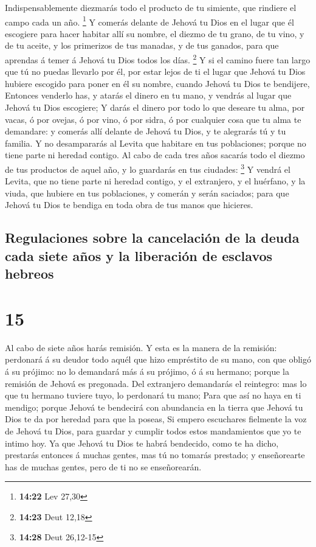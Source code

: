  Indispensablemente diezmarás todo el producto de tu
simiente, que rindiere el campo cada un año. \footnote{\textbf{14:22}
  Lev 27,30}  Y comerás delante de Jehová tu Dios en el
lugar que él escogiere para hacer habitar allí su nombre, el diezmo de
tu grano, de tu vino, y de tu aceite, y los primerizos de tus manadas, y
de tus ganados, para que aprendas á temer á Jehová tu Dios todos los
días. \footnote{\textbf{14:23} Deut 12,18}  Y si el camino
fuere tan largo que tú no puedas llevarlo por él, por estar lejos de ti
el lugar que Jehová tu Dios hubiere escogido para poner en él su nombre,
cuando Jehová tu Dios te bendijere,  Entonces venderlo has,
y atarás el dinero en tu mano, y vendrás al lugar que Jehová tu Dios
escogiere;  Y darás el dinero por todo lo que deseare tu
alma, por vacas, ó por ovejas, ó por vino, ó por sidra, ó por cualquier
cosa que tu alma te demandare: y comerás allí delante de Jehová tu Dios,
y te alegrarás tú y tu familia.  Y no desampararás al
Levita que habitare en tus poblaciones; porque no tiene parte ni heredad
contigo.  Al cabo de cada tres años sacarás todo el diezmo
de tus productos de aquel año, y lo guardarás en tus ciudades:
\footnote{\textbf{14:28} Deut 26,12-15}  Y vendrá el
Levita, que no tiene parte ni heredad contigo, y el extranjero, y el
huérfano, y la viuda, que hubiere en tus poblaciones, y comerán y serán
saciados; para que Jehová tu Dios te bendiga en toda obra de tus manos
que hicieres.

\hypertarget{regulaciones-sobre-la-cancelaciuxf3n-de-la-deuda-cada-siete-auxf1os-y-la-liberaciuxf3n-de-esclavos-hebreos}{%
\subsection{Regulaciones sobre la cancelación de la deuda cada siete
años y la liberación de esclavos
hebreos}\label{regulaciones-sobre-la-cancelaciuxf3n-de-la-deuda-cada-siete-auxf1os-y-la-liberaciuxf3n-de-esclavos-hebreos}}

\hypertarget{section-14}{%
\section{15}\label{section-14}}

 Al cabo de siete años harás remisión.  Y esta
es la manera de la remisión: perdonará á su deudor todo aquél que hizo
empréstito de su mano, con que obligó á su prójimo: no lo demandará más
á su prójimo, ó á su hermano; porque la remisión de Jehová es pregonada.
 Del extranjero demandarás el reintegro: mas lo que tu
hermano tuviere tuyo, lo perdonará tu mano;  Para que así no
haya en ti mendigo; porque Jehová te bendecirá con abundancia en la
tierra que Jehová tu Dios te da por heredad para que la poseas,
 Si empero escuchares fielmente la voz de Jehová tu Dios,
para guardar y cumplir todos estos mandamientos que yo te intimo hoy.
 Ya que Jehová tu Dios te habrá bendecido, como te ha dicho,
prestarás entonces á muchas gentes, mas tú no tomarás prestado; y
enseñorearte has de muchas gentes, pero de ti no se enseñorearán.

